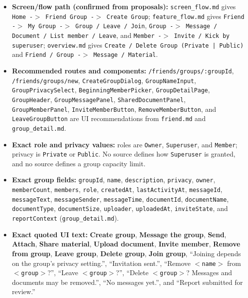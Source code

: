 \documentclass[12pt]{article}
\begin{document}
\begin{itemize}
\item \textbf{Screen/flow path (confirmed from proposals):} \texttt{screen\_flow.md} gives \texttt{Home -$>$ Friend Group -$>$ Create Group}; \texttt{feature\_flow.md} gives \texttt{Friend -$>$ My Group -$>$ Group / Leave / Join}, \texttt{Group -$>$ Message / Document / List member / Leave}, and \texttt{Member -$>$ Invite / Kick by superuser}; \texttt{overview.md} gives \texttt{Create / Delete Group (Private | Public)} and \texttt{Friend / Group -$>$ Message / Material}.
\item \textbf{Recommended routes and components:} \texttt{/friends/groups/:groupId}, \texttt{/friends/groups/new}, \texttt{CreateGroupDialog}, \texttt{GroupNameInput}, \texttt{GroupPrivacySelect}, \texttt{BeginningMemberPicker}, \texttt{GroupDetailPage}, \texttt{GroupHeader}, \texttt{GroupMessagePanel}, \texttt{SharedDocumentPanel}, \texttt{GroupMemberPanel}, \texttt{InviteMemberButton}, \texttt{RemoveMemberButton}, and \texttt{LeaveGroupButton} are UI recommendations from \texttt{friend.md} and \texttt{group\_detail.md}.
\item \textbf{Exact role and privacy values:} roles are \texttt{Owner}, \texttt{Superuser}, and \texttt{Member}; privacy is \texttt{Private} or \texttt{Public}. No source defines how \texttt{Superuser} is granted, and no source defines a group capacity limit.
\item \textbf{Exact group fields:} \texttt{groupId}, \texttt{name}, \texttt{description}, \texttt{privacy}, \texttt{owner}, \texttt{memberCount}, \texttt{members}, \texttt{role}, \texttt{createdAt}, \texttt{lastActivityAt}, \texttt{messageId}, \texttt{messageText}, \texttt{messageSender}, \texttt{messageTime}, \texttt{documentId}, \texttt{documentName}, \texttt{documentType}, \texttt{documentSize}, \texttt{uploader}, \texttt{uploadedAt}, \texttt{inviteState}, and \texttt{reportContext} (\texttt{group\_detail.md}).
\item \textbf{Exact quoted UI text:} \textbf{Create group}, \textbf{Message the group}, \textbf{Send}, \textbf{Attach}, \textbf{Share material}, \textbf{Upload document}, \textbf{Invite member}, \textbf{Remove from group}, \textbf{Leave group}, \textbf{Delete group}, \textbf{Join group}, “Joining depends on the group's privacy setting.”, “Invitation sent.”, “Remove \texttt{$<$name$>$} from \texttt{$<$group$>$}?”, “Leave \texttt{$<$group$>$}?”, “Delete \texttt{$<$group$>$}? Messages and documents may be removed.”, “No messages yet.”, and “Report submitted for review.”

\end{itemize}
\end{document}
